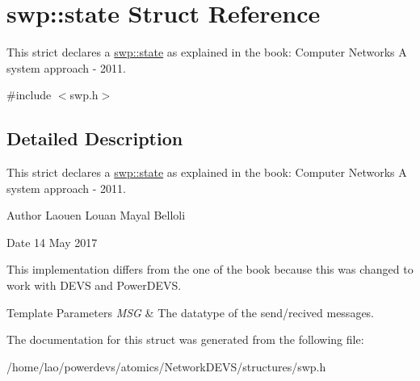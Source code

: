 \hypertarget{structswp_1_1state}{}\section{swp\+:\+:state Struct Reference}
\label{structswp_1_1state}


This strict declares a \hyperlink{structswp_1_1state}{swp\+::state} as explained in the book\+: Computer Networks A system approach -\/ 2011.  




{\ttfamily \#include $<$swp.\+h$>$}



\subsection{Detailed Description}
This strict declares a \hyperlink{structswp_1_1state}{swp\+::state} as explained in the book\+: Computer Networks A system approach -\/ 2011. 

\begin{DoxyAuthor}{Author}
Laouen Louan Mayal Belloli 
\end{DoxyAuthor}
\begin{DoxyDate}{Date}
14 May 2017
\end{DoxyDate}
This implementation differs from the one of the book because this was changed to work with D\+E\+VS and Power\+D\+E\+VS.


\begin{DoxyTemplParams}{Template Parameters}
{\em M\+SG} & The datatype of the send/recived messages. \\
\hline
\end{DoxyTemplParams}


The documentation for this struct was generated from the following file\+:\begin{DoxyCompactItemize}
\item 
/home/lao/powerdevs/atomics/\+Network\+D\+E\+V\+S/structures/swp.\+h\end{DoxyCompactItemize}
